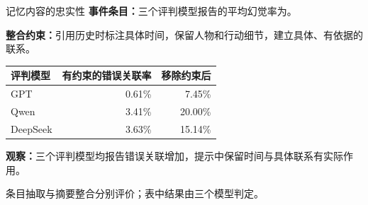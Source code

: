 \begin{frame}{记忆内容的忠实性}
\small
\textbf{事件条目：}三个评判模型报告的平均幻觉率为。\par
\vspace{3mm}
\textbf{整合约束：}引用历史时标注具体时间，保留人物和行动细节，建立具体、有依据的联系。\par
\vspace{3mm}
\renewcommand{\arraystretch}{1.25}
\begin{tabularx}{\linewidth}{@{}Yrr@{}}
\toprule 评判模型 & 有约束的错误关联率 & 移除约束后\\\midrule
GPT & 0.61\% & 7.45\%\\
Qwen & 3.41\% & 20.00\%\\
DeepSeek & 3.63\% & 15.14\%\\\bottomrule
\end{tabularx}\par
\vspace{3mm}
\textbf{观察：}三个评判模型均报告错误关联增加，提示中保留时间与具体联系有实际作用。\par
\par\vspace{3mm}条目抽取与摘要整合分别评价；表中结果由三个模型判定。\par
{}
\end{frame}

